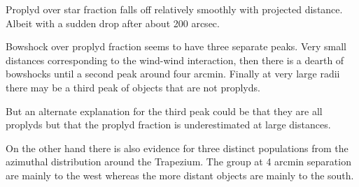 \documentclass{emulateapj}
\begin{document}
Proplyd over star fraction falls off relatively smoothly with projected distance.  Albeit with a sudden drop after about 200 arcsec.


Bowshock over proplyd fraction seems to have three separate peaks.   Very small distances corresponding to the wind-wind interaction, then there is a dearth of bowshocks until a second peak around four arcmin.  Finally at very large radii there may be a third peak of objects that are not proplyds.

But an alternate explanation for the third peak could be that they are all proplyds but that the proplyd fraction is underestimated at large distances.

On the other hand there is also evidence for three distinct populations from the azimuthal distribution around the Trapezium.  The group at 4 arcmin separation are mainly to the west whereas the more distant objects are mainly to the south.
\end{document}
